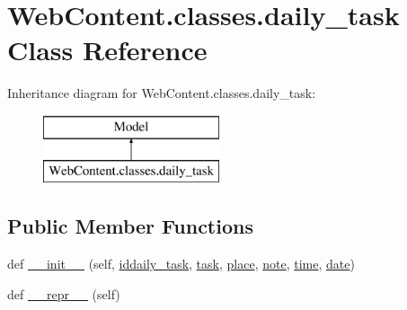 \hypertarget{class_web_content_1_1classes_1_1daily__task}{}\section{Web\+Content.\+classes.\+daily\+\_\+task Class Reference}
\label{class_web_content_1_1classes_1_1daily__task}
Inheritance diagram for Web\+Content.\+classes.\+daily\+\_\+task\+:\begin{figure}[H]
\begin{center}
\leavevmode
\includegraphics[height=2.000000cm]{class_web_content_1_1classes_1_1daily__task}
\end{center}
\end{figure}
\subsection*{Public Member Functions}
\begin{DoxyCompactItemize}
\item 
def \hyperlink{class_web_content_1_1classes_1_1daily__task_ad42f8d2b69ae7b520baf2ff107d412dd}{\+\_\+\+\_\+init\+\_\+\+\_\+} (self, \hyperlink{class_web_content_1_1classes_1_1daily__task_a16bbcb32784e7dce04634c70d657d17d}{iddaily\+\_\+task}, \hyperlink{class_web_content_1_1classes_1_1daily__task_aafd4c49d7d757e26f13bf61a4e6aa875}{task}, \hyperlink{class_web_content_1_1classes_1_1daily__task_acd856b954382e792e6e5c28fd830121e}{place}, \hyperlink{class_web_content_1_1classes_1_1daily__task_a8adebd433b814a8e63ddff8c74dec3ae}{note}, \hyperlink{class_web_content_1_1classes_1_1daily__task_ad2c51b720cec786c89d5742e03b240ca}{time}, \hyperlink{class_web_content_1_1classes_1_1daily__task_a3d81a54b4ec50f7b09a5c9a7126e1b91}{date})
\item 
def \hyperlink{class_web_content_1_1classes_1_1daily__task_aceb8f58140226c7c645ecd7d75f875bd}{\+\_\+\+\_\+repr\+\_\+\+\_\+} (self)
\end{DoxyCompactItemize}
